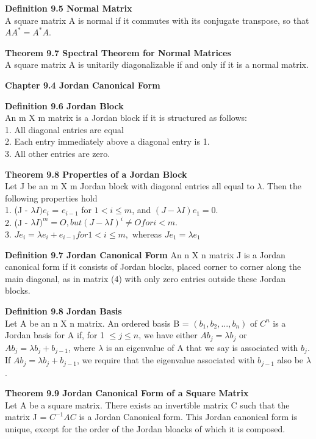 \documentclass {article}
\begin{document}
\textbf {Definition 9.5 Normal Matrix} \\
A square matrix A is normal if it commutes with its conjugate transpose, so that $AA^* = A^*A$.

\textbf {Theorem 9.7 Spectral Theorem for Normal Matrices} \\ 
A square matrix A is unitarily diagonalizable if and only if it is a normal matrix.

\textbf {Chapter 9.4 Jordan Canonical Form}

\textbf {Definition 9.6 Jordan Block} \\
An m X m matrix is a Jordan block if it is structured as follows: \\
1. All diagonal entries are equal \\
2. Each entry immediately above a diagonal entry is 1. \\
3. All other entries are zero.

\textbf {Theorem 9.8 Properties of a Jordan Block} \\
Let J be an m X m Jordan block with diagonal entries all equal to $\lambda$. Then the following properties hold \\
1. (J - $\lambda I)e_i$ = $e_{i-1}$ for $1 < i \leq m$, and $(J - \lambda I)e_1 = 0.$ \\

2. (J - $\lambda I)^m = O, but (J - \lambda I)^i \neq O for i < m.$ \\
3. $Je_i = \lambda e_i + e_{i-1} for 1 < i \leq m,$ whereas $Je_1 = \lambda e_1$

\textbf {Definition 9.7 Jordan Canonical Form} An n X n matrix J is a Jordan canonical form if it consists of Jordan blocks, placed corner to corner along the main diagonal, as in matrix (4) with only zero entries outside these Jordan blocks.

\textbf {Definition 9.8 Jordan Basis} \\
Let A be an n X n matrix. An ordered basis B = $(b_1,b_2,...,b_n)$ of $C^n$ is a Jordan basis for A if, for 1 $\leq j \leq n$, we have either $Ab_j = \lambda b_j$ or $Ab_j = \lambda b_j + b_{j-1}$, where $\lambda$ is an eigenvalue of A that we say is associated with $b_j$. If $Ab_j = \lambda b_j + b_{j-1}$, we require that the eigenvalue associated with $b_{j-1}$ also be $\lambda$.

\textbf {Theorem 9.9 Jordan Canonical Form of a Square Matrix} \\
Let A be a square matrix. There exists an invertible matrix C such that the matrix J = $C^{-1}AC$ is a Jordan Canonical form. This Jordan canonical form is unique, except for the order of the Jordan bloacks of which it is composed.
\end{document}
